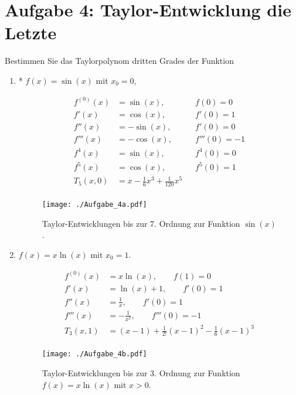 \documentclass[11pt,a4paper, parskip=half ]{report}
\begin{document}
  \section*{Aufgabe 4:  Taylor-Entwicklung die Letzte}
  Bestimmen Sie das Taylorpolynom dritten Grades der Funktion \begin{enumerate}
    \item* $f(x) = \sin(x)$ mit $x_0 = 0$,
    
    \vspace{20pt}
  \begin{align*}
  f^{(0)}(x) &= \sin(x), \qquad &f(0) = 0 \\ 
  f'(x)      &= \cos(x), \qquad &f'(0) = 1 \\
  f''(x)     &= -\sin(x), \qquad &f'(0) = 0 \\
  f'''(x)    &= -\cos(x), \qquad &f'''(0) = -1 \\
  f^{4}(x)    &= \sin(x), \qquad &f^{4}(0) = 0 \\
  f^{5}(x)    &= \cos(x), \qquad &f^{5}(0) = 1 \\
  T_5 (x, 0) &= x - \frac{1}{6} x^3 + \frac{1}{120} x^5  &\\
  \end{align*}

  \begin{figure}
    \centering
    \texttt{[image: ./Aufgabe\_4a.pdf]}
    \caption{Taylor-Entwicklungen bis zur 7. Ordnung zur Funktion $\sin(x)$.}
    \label{fig:feynman2}
  \end{figure}

    \item $f(x) = x \ln(x)$ mit $x_0 = 1$. 
    
    \vspace{20pt}
    \begin{align*}
    f^{(0)}(x) &= x \ln(x), \qquad f(1) = 0 \\ 
    f'(x)      &= \ln(x) + 1, \qquad f'(0) = 1 \\
    f''(x)     &= \frac{1}{x}, \qquad f'(0) = 1 \\
    f'''(x)    &= -\frac{1}{x^2} , \qquad f'''(0) = -1 \\
    T_3 (x, 1) &= (x -1) + \frac{1}{2!} (x-1)^2 - \frac{1}{6} (x-1)^3 \\
    \end{align*}

    \begin{figure}
      \centering
      \texttt{[image: ./Aufgabe\_4b.pdf]}
      \caption{Taylor-Entwicklungen bis zur 3. Ordnung zur Funktion $f(x) = x \ln(x)$ mit $x > 0$.}
      \label{fig:feynman2}
    \end{figure}

  \end{enumerate}
\end{document}
